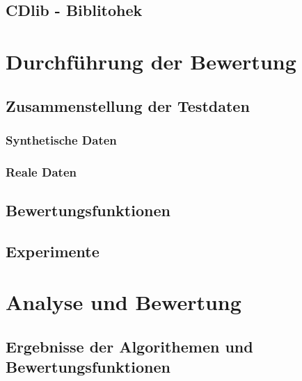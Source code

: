 \section{CDlib - Biblitohek}\label{CDlib - Bibliothek}

\chapter{Durchführung der Bewertung}

\section{Zusammenstellung der Testdaten}\label{Zusammenstellung der Testdaten}

\subsection{Synthetische Daten}\label{Synthetische Daten}

\subsection{Reale Daten}\label{Reale Daten}

\section{Bewertungsfunktionen}\label{Bewertungsfunktionen}

\section{Experimente}\label{Experimente}

\chapter{Analyse und Bewertung}

\section{Ergebnisse der Algorithemen und Bewertungsfunktionen}\label{Ergebnisse der Algorithemen und Bewertungsfunktionen}

